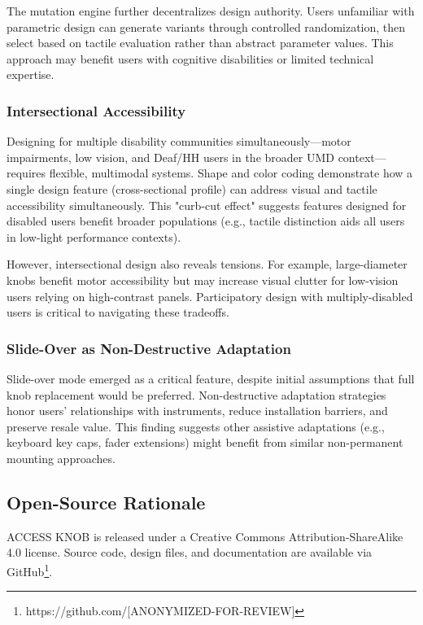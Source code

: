 \documentclass[sigconf]{nimeart}
\begin{document}
The mutation engine further decentralizes design authority. Users unfamiliar with parametric design can generate variants through controlled randomization, then select based on tactile evaluation rather than abstract parameter values. This approach may benefit users with cognitive disabilities or limited technical expertise.

\subsubsection{Intersectional Accessibility}

Designing for multiple disability communities simultaneously—motor impairments, low vision, and Deaf/HH users in the broader UMD context—requires flexible, multimodal systems. Shape and color coding demonstrate how a single design feature (cross-sectional profile) can address visual and tactile accessibility simultaneously. This "curb-cut effect"\cite{treviranus2014} suggests features designed for disabled users benefit broader populations (e.g., tactile distinction aids all users in low-light performance contexts).

However, intersectional design also reveals tensions. For example, large-diameter knobs benefit motor accessibility but may increase visual clutter for low-vision users relying on high-contrast panels. Participatory design with multiply-disabled users is critical to navigating these tradeoffs.

\subsubsection{Slide-Over as Non-Destructive Adaptation}

Slide-over mode emerged as a critical feature, despite initial assumptions that full knob replacement would be preferred. Non-destructive adaptation strategies honor users' relationships with instruments, reduce installation barriers, and preserve resale value. This finding suggests other assistive adaptations (e.g., keyboard key caps, fader extensions) might benefit from similar non-permanent mounting approaches.

\subsection{Open-Source Rationale}

ACCESS KNOB is released under a Creative Commons Attribution-ShareAlike 4.0 license. Source code, design files, and documentation are available via GitHub\footnote{https://github.com/[ANONYMIZED-FOR-REVIEW]}.
\end{document}
